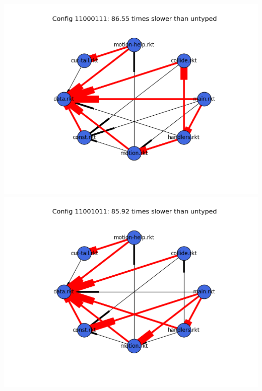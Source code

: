 \documentclass{article}
\begin{document}
\begin{itemize}
\includegraphics[width=\textwidth]{snake-2015-04-10-module-graph-11000111.png}
\includegraphics[width=\textwidth]{snake-2015-04-10-module-graph-11001011.png}
\end{itemize}
\end{document}
